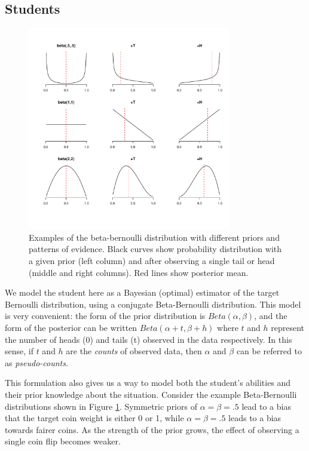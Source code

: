 \documentclass[10pt,letterpaper]{article}
\begin{document}
\subsection{Students}

\begin{figure}[t]
\begin{center}
\includegraphics[width=3.5in]{figures/students.pdf}
\end{center}
\caption{\label{fig:students} Examples of the beta-bernoulli distribution with different priors and patterns of evidence. Black curves show probability distribution with a given prior (left column) and after observing a single tail or head (middle and right columns). Red lines show posterior mean.}
\end{figure}

We model the student here as a Bayesian (optimal) estimator of the target Bernoulli distribution, using a conjugate Beta-Bernoulli distribution. This model is very convenient: the form of the prior distribution is $Beta(\alpha,\beta)$, and the form of the posterior can be written $Beta(\alpha+t,\beta+h)$ where $t$ and $h$ represent the number of heads (0) and tails (t) observed in the data respectively. In this sense, if $t$ and $h$ are the \emph{counts} of observed data, then $\alpha$ and $\beta$ can be referred to as \emph{pseudo-counts}.

This formulation also gives us a way to model both the student's abilities and their prior knowledge about the situation. Consider the example Beta-Bernoulli distributions shown in Figure \ref{fig:students}. Symmetric priors of $\alpha=\beta=.5$ lead to a bias that the target coin weight is either 0 or 1, while $\alpha=\beta=.5$ leads to a bias towards fairer coins. As the strength of the prior grows, the effect of observing a single coin flip becomes weaker.
\end{document}

